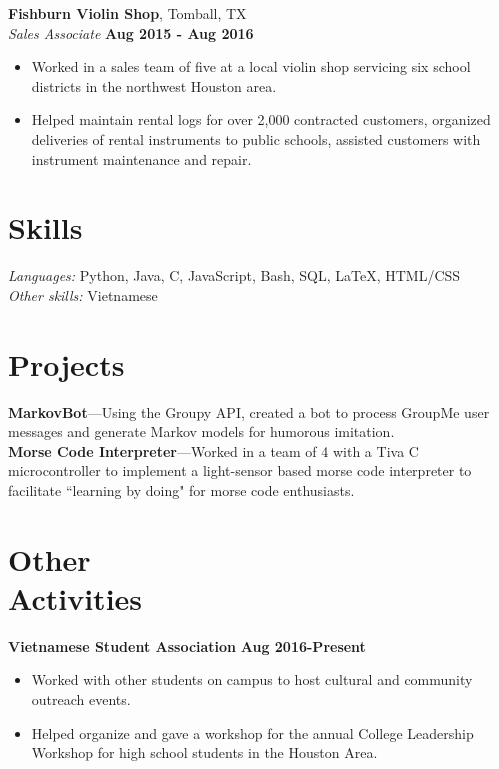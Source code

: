 \documentclass[margin,line]{resume}
\begin{document}
\begin{resume}
\textbf{Fishburn Violin Shop}, Tomball, TX \vspace{2mm}\\\vspace{1mm}%
\textsl{Sales Associate} \hfill \textbf{Aug 2015 -
Aug 2016}
\begin{itemize}
    \item Worked in a sales team of five at a local violin shop servicing six school districts in the northwest Houston area.
    \item Helped maintain rental logs for over 2,000 contracted customers, organized deliveries of rental instruments to public schools, assisted customers with instrument maintenance and repair.
\end{itemize}
\vspace{1mm}%

\section{\mysidestyle Skills}

\emph{Languages: } Python, Java, C, JavaScript, Bash, SQL, \LaTeX, HTML/CSS \\
\emph{Other skills:} Vietnamese

\section{\mysidestyle Projects}

\textbf{MarkovBot}---Using the Groupy API, created a bot to process GroupMe user messages and generate Markov models for humorous imitation.\vspace{1mm}\\
\textbf{Morse Code Interpreter}---Worked in a team of 4 with a Tiva C microcontroller to implement a light-sensor based morse code interpreter to facilitate ``learning by doing" for morse code enthusiasts.


\section{\mysidestyle Other\\ Activities}
\textbf{Vietnamese Student Association} \hfill \textbf{Aug 2016-Present}
\begin{itemize}
    \item Worked with other students on campus to host cultural and community outreach events.
    \item Helped organize and gave a workshop for the annual College Leadership Workshop for high school students in the Houston Area.
\end{itemize}



\end{resume}
\end{document}
